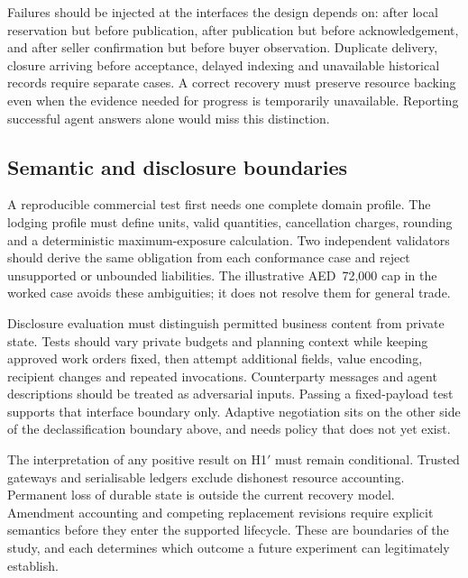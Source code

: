 Failures should be injected at the interfaces the design depends on: after local reservation but before publication, after publication but before acknowledgement, and after seller confirmation but before buyer observation. Duplicate delivery, closure arriving before acceptance, delayed indexing and unavailable historical records require separate cases. A correct recovery must preserve resource backing even when the evidence needed for progress is temporarily unavailable. Reporting successful agent answers alone would miss this distinction.

\subsection{Semantic and disclosure boundaries}

A reproducible commercial test first needs one complete domain profile. The lodging profile must define units, valid quantities, cancellation charges, rounding and a deterministic maximum-exposure calculation. Two independent validators should derive the same obligation from each conformance case and reject unsupported or unbounded liabilities. The illustrative AED~72,000 cap in the worked case avoids these ambiguities; it does not resolve them for general trade.

Disclosure evaluation must distinguish permitted business content from private state. Tests should vary private budgets and planning context while keeping approved work orders fixed, then attempt additional fields, value encoding, recipient changes and repeated invocations. Counterparty messages and agent descriptions should be treated as adversarial inputs. Passing a fixed-payload test supports that interface boundary only. Adaptive negotiation sits on the other side of the declassification boundary above, and needs policy that does not yet exist.

The interpretation of any positive result on H1$'$ must remain conditional. Trusted gateways and serialisable ledgers exclude dishonest resource accounting. Permanent loss of durable state is outside the current recovery model. Amendment accounting and competing replacement revisions require explicit semantics before they enter the supported lifecycle. These are boundaries of the study, and each determines which outcome a future experiment can legitimately establish.
